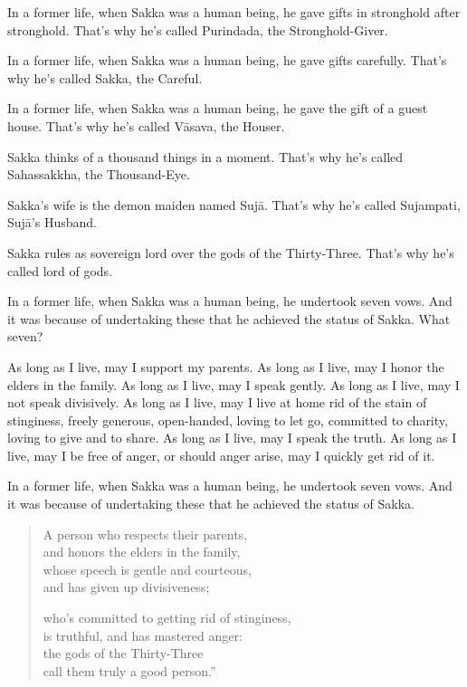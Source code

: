 \documentclass[12pt,openany]{book}%
\begin{document}
In a former life, when Sakka was a human being, he gave gifts in stronghold after stronghold. That’s why he’s called Purindada, the Stronghold-Giver. 

In a former life, when Sakka was a human being, he gave gifts carefully. That’s why he’s called Sakka, the Careful. 

In a former life, when Sakka was a human being, he gave the gift of a guest house. That’s why he’s called \textsanskrit{Vāsava}, the Houser. 

Sakka thinks of a thousand things in a moment. That’s why he’s called Sahassakkha, the Thousand-Eye. 

Sakka’s wife is the demon maiden named \textsanskrit{Sujā}. That’s why he’s called Sujampati, \textsanskrit{Sujā}’s Husband. 

Sakka rules as sovereign lord over the gods of the Thirty-Three. That’s why he’s called lord of gods. 

In a former life, when Sakka was a human being, he undertook seven vows. And it was because of undertaking these that he achieved the status of Sakka. What seven? 

As long as I live, may I support my parents. As long as I live, may I honor the elders in the family. As long as I live, may I speak gently. As long as I live, may I not speak divisively. As long as I live, may I live at home rid of the stain of stinginess, freely generous, open-handed, loving to let go, committed to charity, loving to give and to share. As long as I live, may I speak the truth. As long as I live, may I be free of anger, or should anger arise, may I quickly get rid of it. 

In a former life, when Sakka was a human being, he undertook seven vows. And it was because of undertaking these that he achieved the status of Sakka. 

\begin{verse}%
A person who respects their parents, \\
and honors the elders in the family, \\
whose speech is gentle and courteous, \\
and has given up divisiveness; 

who’s committed to getting rid of stinginess, \\
is truthful, and has mastered anger: \\
the gods of the Thirty-Three \\
call them truly a good person.” 

%
\end{verse}
\end{document}
